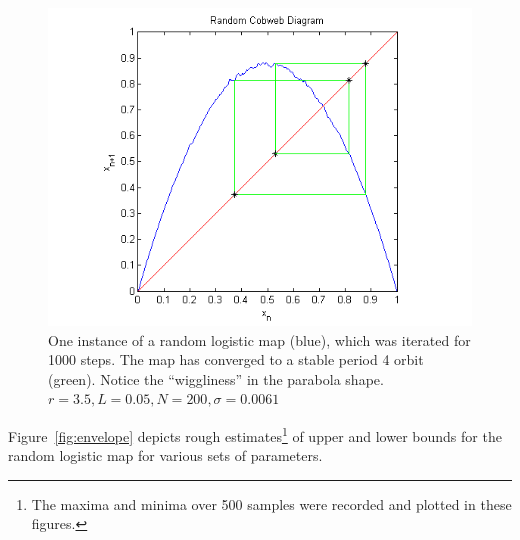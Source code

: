 \begin{figure}[!h]
\caption[Random logistic map, stable orbit]{One instance of a random
  logistic map (blue), which was iterated for 1000 steps. The map has converged to a stable period 4 orbit (green). Notice the
  ``wiggliness'' in the parabola shape. $r=3.5,L=0.05,N=200,\sigma=0.0061$}\label{fig:rlogstable}
	\begin{center}
		\includegraphics[scale=0.7]{figs/rand_cobweb.png}
	\end{center}
\end{figure}
 Figure~\ref{fig:envelope} depicts rough estimates\footnote{The
  maxima and minima over 500 samples were recorded and plotted in
  these figures.} of upper and lower bounds for the random logistic
map for various sets of parameters. 
